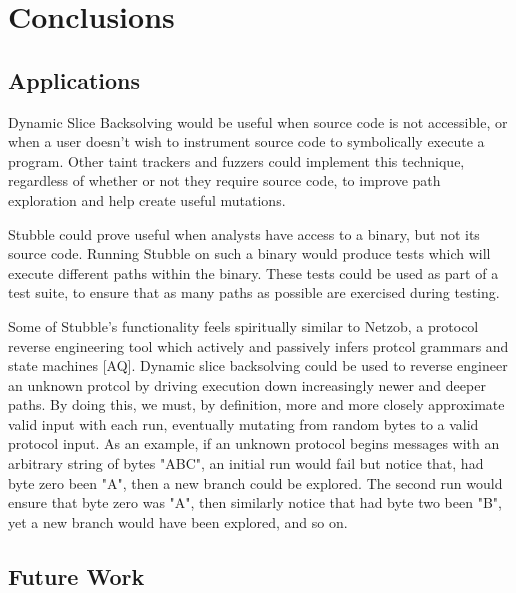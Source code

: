 \documentclass[11pt,expanded,copyright]{fsuthesis}
\begin{document}
	
\chapter{Conclusions}

\section{Applications}


Dynamic Slice Backsolving would be useful when source code is not accessible, or when a user doesn't wish to instrument source code to symbolically execute a program. Other taint trackers and fuzzers could implement this technique, regardless of whether or not they require source code, to improve path exploration and help create useful mutations.

Stubble could prove useful when analysts have access to a binary, but not its source code. Running Stubble on such a binary would produce tests which will execute different paths within the binary. These tests could be used as part of a test suite, to ensure that as many paths as possible are exercised during testing.

Some of Stubble's functionality feels spiritually similar to Netzob, a protocol reverse engineering tool which actively and passively infers protcol grammars and state machines [AQ]. Dynamic slice backsolving could be used to reverse engineer an unknown protcol by driving execution down increasingly newer and deeper paths. By doing this, we must, by definition, more and more closely approximate valid input with each run, eventually mutating from random bytes to a valid protocol input. As an example, if an unknown protocol begins messages with an arbitrary string of bytes "ABC", an initial run would fail but notice that, had byte zero been "A", then a new branch could be explored. The second run would ensure that byte zero was "A", then similarly notice that had byte two been "B", yet a new branch would have been explored, and so on.

\section{Future Work}
\end{document}
